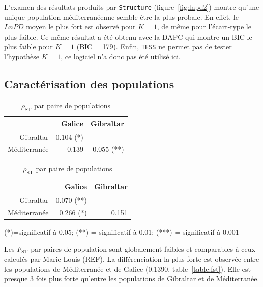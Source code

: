 \documentclass[a4paper,12pt,twoside]{article}\usepackage[]{graphicx}\usepackage[]{color}
\begin{document}
L'examen des résultats produits par \texttt{Structure} (figure~\ref{fig:lnpd2}) montre qu'une unique population méditerranéenne semble être la plus probale. En effet, le $LnPD$ moyen le plus fort est observé pour $K=1$, de même pour l'écart-type le plus faible. Ce même résultat a été obtenu avec la DAPC qui montre un BIC le plus faible pour $K=1$ (BIC = 179). Enfin, \texttt{TESS} ne permet pas de tester l'hypothèse $K=1$, ce logiciel n'a donc pas été utilisé ici.

\subsection{Caractérisation des populations}

\begin{table}[htpb]
\begin{center}
\begin{minipage}{.48\textwidth}
\centering
\caption{$F_\textrm{ST}$ par paire de populations}
\label{table:fst}
\begin{tabular}{rrr}
\toprule
   &   Galice   &    Gibraltar    \\
\midrule
Gibraltar   &   0.104 (*) 	& - \\
Méditerranée   &   0.139 & 0.055 (**) \\
\bottomrule
\end{tabular}

\end{minipage}
\hfill
\begin{minipage}{.48\textwidth}
\centering
\caption{$\rho_\textrm{ST}$ par paire de populations}
\label{table:rho}
\begin{tabular}{rrr}
\toprule
   &   Galice   &    Gibraltar    \\
\midrule
Gibraltar   &   0.070 (**) 	& - \\
Méditerranée   &   0.266 (*) & 0.151 \\
\bottomrule
\end{tabular}

\end{minipage}
(*)=significatif à 0.05; (**) = significatif à 0.01; (***) = significatif à 0.001
\end{center}
\end{table}

Les $F_\textrm{ST}$ par paires de population sont globalement faibles et comparables à ceux calculés par Marie Louis (REF). La différenciation la plus forte est observée entre les populations de Méditerranée et de Galice (0.1390, table~\ref{table:fst}). Elle est presque 3 fois plus forte qu'entre les populations de Gibraltar et de Méditerranée.
\end{document}
